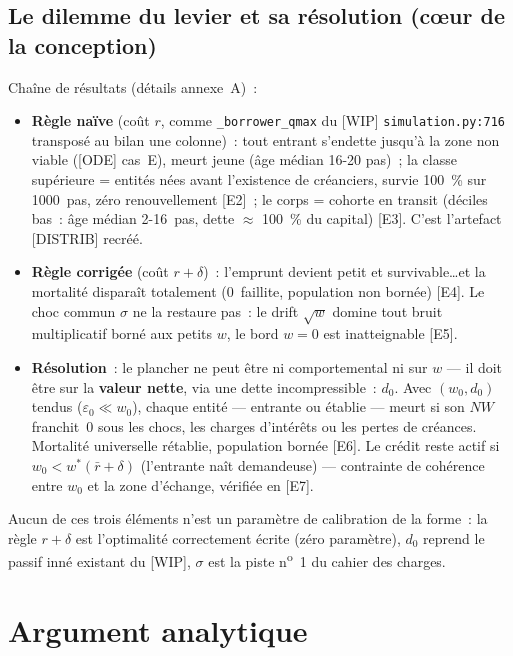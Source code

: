 \documentclass[11pt,a4paper]{article}
\newcommand{\NW}{\mathit{NW}}
\begin{document}
\subsection{Le dilemme du levier et sa résolution (cœur de la conception)}
\label{sec:dilemme-levier}

Chaîne de résultats (détails annexe~A)~:

\begin{itemize}
  \item \textbf{Règle naïve} (coût $r$, comme \texttt{_borrower_qmax} du [WIP] \texttt{simulation.py:716} transposé au bilan une colonne)~: tout entrant s'endette jusqu'à la zone non viable ([ODE] cas~E), meurt jeune (âge médian 16-20 pas)~; la classe supérieure = entités nées avant l'existence de créanciers, survie 100~\% sur 1000~pas, zéro renouvellement [E2]~; le corps = cohorte en transit (déciles bas~: âge médian 2-16~pas, dette $\approx$ 100~\% du capital) [E3]. C'est l'artefact [DISTRIB] recréé.
  \item \textbf{Règle corrigée} (coût $r+\delta$)~: l'emprunt devient petit et survivable\ldots et la mortalité disparaît totalement (0~faillite, population non bornée) [E4]. Le choc commun $\sigma$ ne la restaure pas~: le drift $\sqrt{w}$ domine tout bruit multiplicatif borné aux petits $w$, le bord $w=0$ est inatteignable [E5].
  \item \textbf{Résolution}~: le plancher ne peut être ni comportemental ni sur $w$ --- il doit être sur la \textbf{valeur nette}, via une dette incompressible~: $d_0$. Avec $(w_0, d_0)$ tendus ($\varepsilon_0 \ll w_0$), chaque entité --- entrante ou établie --- meurt si son $\NW$ franchit~0 sous les chocs, les charges d'intérêts ou les pertes de créances. Mortalité universelle rétablie, population bornée [E6]. Le crédit reste actif si $w_0 < w^*(\bar r+\delta)$ (l'entrante naît demandeuse) --- contrainte de cohérence entre $w_0$ et la zone d'échange, vérifiée en [E7].
\end{itemize}

Aucun de ces trois éléments n'est un paramètre de calibration de la forme~: la règle $r+\delta$ est l'optimalité correctement écrite (zéro paramètre), $d_0$ reprend le passif inné existant du [WIP], $\sigma$ est la piste n\textsuperscript{o}~1 du cahier des charges.

\section{Argument analytique}
\label{sec:analytique}
\end{document}
